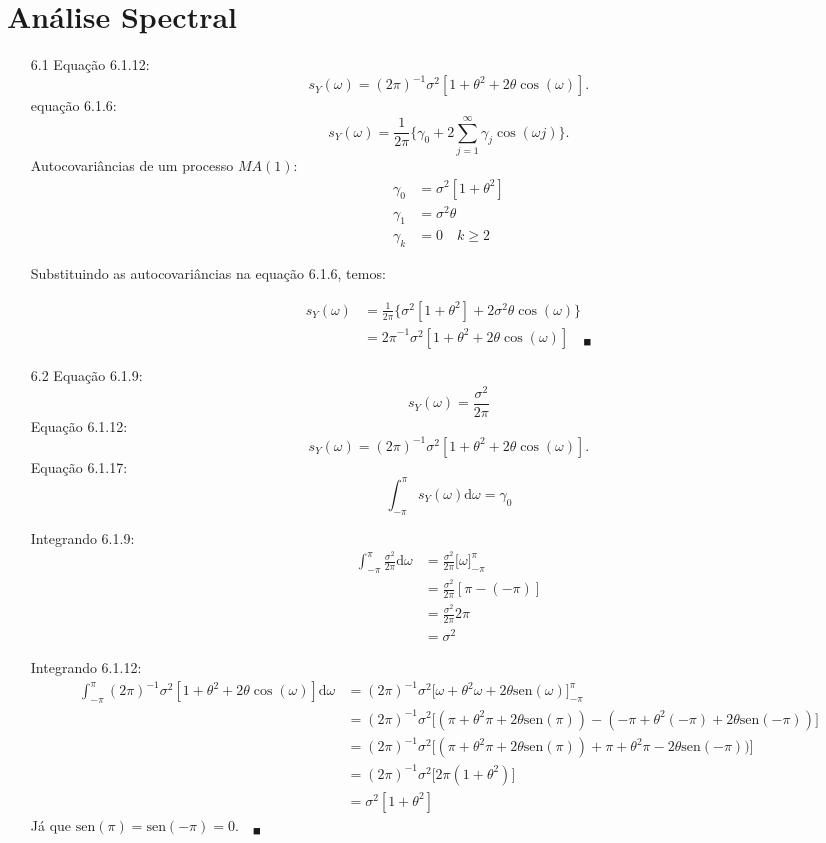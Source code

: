\chapter{Análise Spectral}

\begin{enumerate}
	\item[6.1]
	Equação 6.1.12: $$s_Y(\omega)=(2\pi)^{-1}\sigma^2[1+\theta^2+2\theta\cos(\omega)].$$
	equação 6.1.6: $$s_Y(\omega)=\frac{1}{2\pi}\bigg\{\gamma_0+2\sum\limits_{j=1}^{\infty}\gamma_j\cos(\omega j)\bigg\}.$$
	Autocovariâncias de um processo $MA(1)$:
	\begin{align*}
	\gamma_0&=\sigma^2[1+\theta^2]\\
	\gamma_1&=\sigma^2\theta\\
	\gamma_k&=0\quad k\geqslant2
	\end{align*}

Substituindo as autocovariâncias na equação 6.1.6, temos:

\begin{align*}
	s_Y(\omega)&=\frac{1}{2\pi}\bigg\{\sigma^2[1+\theta^2]+2\sigma^2\theta\cos(\omega )\bigg\}\\
	&={2\pi}^{-1}\sigma^2[1+\theta^2+2\theta\cos(\omega )]\quad_{\blacksquare}
\end{align*}

	\item[6.2]
	Equação 6.1.9:
	$$s_Y(\omega)=\frac{\sigma^2}{2\pi}$$
	Equação 6.1.12:
	$$s_Y(\omega)=(2\pi)^{-1}\sigma^2[1+\theta^2+2\theta\cos(\omega)].$$
	Equação 6.1.17:
	$$\int_{-\pi}^{\pi}s_Y(\omega)\mathrm{d}\omega=\gamma_0$$

	Integrando 6.1.9:
	\begin{align*}
		\int_{-\pi}^{\pi}\frac{\sigma^2}{2\pi}\mathrm{d}\omega&=\frac{\sigma^2}{2\pi}\bigg[\omega\bigg]^{\pi}_{-\pi}\\
		&=\frac{\sigma^2}{2\pi}[\pi-(-\pi)]\\
		&=\frac{\sigma^2}{2\pi}2\pi\\
		&=\sigma^2
	\end{align*}

	Integrando 6.1.12:
	\begin{align*}
		\int_{-\pi}^{\pi}(2\pi)^{-1}\sigma^2[1+\theta^2+2\theta\cos(\omega)]\mathrm{d}\omega&=(2\pi)^{-1}\sigma^2\bigg[\omega+\theta^2\omega+2\theta\mathrm{sen}(\omega)\bigg]_{-\pi}^{\pi}\\
		&=(2\pi)^{-1}\sigma^2\bigg[(\pi+\theta^2\pi+2\theta\mathrm{sen}(\pi))-(-\pi+\theta^2(-\pi)+2\theta\mathrm{sen}(-\pi))\bigg]\\
		&=(2\pi)^{-1}\sigma^2\bigg[(\pi+\theta^2\pi+2\theta\mathrm{sen}(\pi))+\pi+\theta^2\pi-2\theta\mathrm{sen}(-\pi))\bigg]\\
		&=(2\pi)^{-1}\sigma^2\bigg[2\pi(1+\theta^2)\bigg]\\
		&=\sigma^2[1+\theta^2]
	\end{align*}
Já que $\mathrm{sen}(\pi)=\mathrm{sen}(-\pi)=0.\quad_{\blacksquare}$
\end{enumerate}
